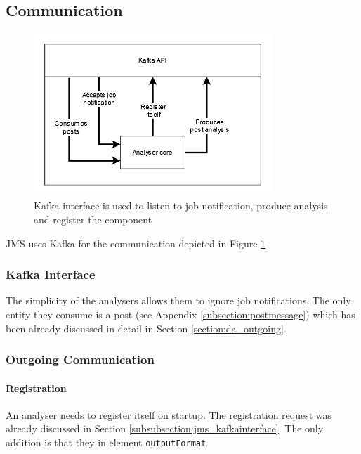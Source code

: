 \subsection{Communication}\label{subsection:ds_communication}
\begin{figure}[H]
    \centering
    \includegraphics[width=0.8\textwidth]{diagrams/api-ds.png}
    \caption{Kafka interface is used to listen to job notification, produce analysis and register the component}
    \label{fig:apiDs}
\end{figure}
JMS uses Kafka for the communication depicted in Figure \ref{fig:apiDs}



\subsubsection{Kafka Interface}\label{subsubsection:ds_kafkainterface}

The simplicity of the analysers allows them to ignore job notifications. The only entity they consume is a post (see Appendix \ref{subsection:postmessage}) which has been already discussed in detail in Section \ref{section:da_outgoing}.

\subsubsection{Outgoing Communication}

\paragraph{Registration}\label{subsubsection:registration_analyser}

An analyser needs to register itself on startup. The registration request was already discussed in Section \ref{subsubsection:jms_kafkainterface}. The only addition is that they in element \texttt{outputFormat}.

